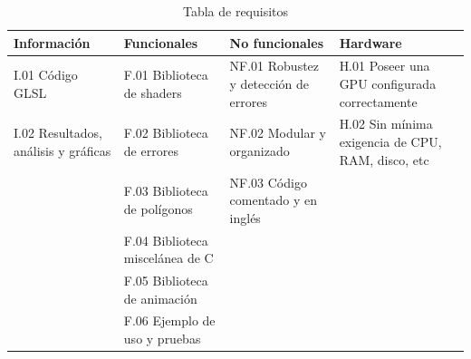 \begin{table}[htp]
\centering


    
    \begin{tabular}{ | p{3cm} | p{3cm} | p{3cm}| p{3cm} | }
        

        \hline
        \textbf{Información} & \textbf{Funcionales} & \textbf{No funcionales} & \textbf{Hardware}\\
        \hline
        
        I.01 Código GLSL & F.01 Biblioteca de shaders & NF.01 Robustez y detección de errores & H.01 Poseer una GPU configurada correctamente \\
        \hline
        I.02 Resultados, análisis y gráficas & F.02 Biblioteca de errores & NF.02 Modular y organizado & H.02 Sin mínima exigencia de CPU, RAM, disco, etc \\
        \hline
         & F.03 Biblioteca de polígonos & NF.03 Código comentado y en inglés & \\
        \hline
         & F.04 Biblioteca miscelánea de C & & \\
        \hline
         & F.05 Biblioteca de animación & & \\
        \hline
         & F.06 Ejemplo de uso y pruebas & & \\
        \hline
        
    \end{tabular} 
    
    \caption{Tabla de requisitos}
    \label{table:requirements} 
\end{table}
